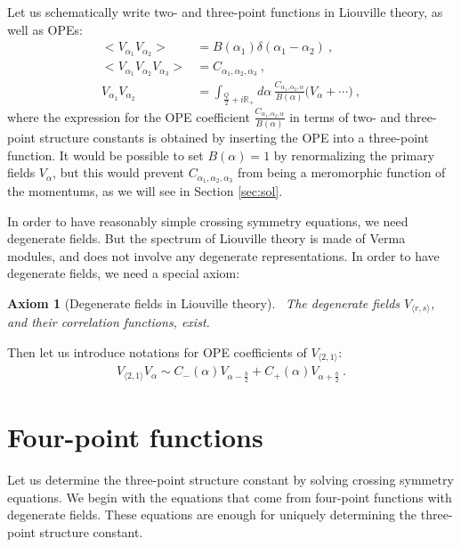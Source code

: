 \documentclass[12pt, a4paper]{article}
\theoremstyle{break}
\newtheorem{hyp}[exo]{Axiom}
\begin{document}
Let us schematically write two- and three-point functions in Liouville theory, as well as OPEs:
\begin{align}
 \Big< V_{\alpha_1}V_{\alpha_2} \Big>  &=  B(\alpha_1)\delta(\alpha_1-\alpha_2)\ ,
 \label{eq:vv}
 \\
 \Big< V_{\alpha_1}V_{\alpha_2}V_{\alpha_3} \Big> & = C_{\alpha_1,\alpha_2,\alpha_3} \ ,
 \label{eq:vvv}
 \\
 V_{\alpha_1}V_{\alpha_2} &= \int_{\frac{Q}{2}+i\mathbb{R}_+} d\alpha\, \frac{C_{\alpha_1,\alpha_2,\alpha}}{B(\alpha)} \Big( V_\alpha + \cdots\Big)\ ,
 \label{eq:v1v2}
\end{align}
where the expression for the OPE coefficient $\frac{C_{\alpha_1,\alpha_2,\alpha}}{B(\alpha)}$ in terms of two- and three-point structure constants is obtained by inserting the OPE into a three-point function. It would be possible to set $B(\alpha)=1$ by renormalizing the primary fields $V_{\alpha}$, but this would prevent $C_{\alpha_1,\alpha_2,\alpha_3}$ from being a meromorphic function of the momentums, as we will see in Section \ref{sec:sol}.

In order to have reasonably simple crossing symmetry equations, we need degenerate fields. 
But the spectrum of Liouville theory is made of Verma modules, and does not involve any degenerate representations.
In order to have degenerate fields, we need a special axiom:

\begin{hyp}[Degenerate fields in Liouville theory]
 ~\label{hyp:degl}
 The degenerate fields $V_{\langle r, s\rangle}$, and their correlation functions, exist. 
\end{hyp}
Then let us introduce notations for OPE coefficients of $V_{\langle 2, 1\rangle}$:
\begin{align}
 V_{\langle 2, 1\rangle} V_\alpha \sim C_-(\alpha) V_{\alpha-\frac{b}{2}} + C_+(\alpha)V_{\alpha +\frac{b}{2}}\ .
 \label{degope}
\end{align}


\section{Four-point functions}\label{sec:4pt}

Let us determine the three-point structure constant by solving crossing symmetry equations. We begin with the equations that come from four-point functions with degenerate fields. These equations are enough for uniquely determining the three-point structure constant.
\end{document}
